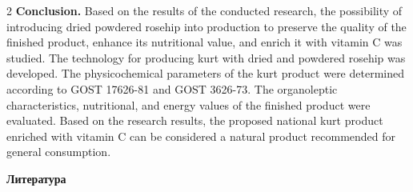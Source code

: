 \begin{multicols}{2}
{\bfseries Conclusion.} Based on the results of the conducted research, the
possibility of introducing dried powdered rosehip into production to
preserve the quality of the finished product, enhance its nutritional
value, and enrich it with vitamin C was studied. The technology for
producing kurt with dried and powdered rosehip was developed. The
physicochemical parameters of the kurt product were determined according
to GOST 17626-81 and GOST 3626-73. The organoleptic characteristics,
nutritional, and energy values of the finished product were evaluated.
Based on the research results, the proposed national kurt product
enriched with vitamin C can be considered a natural product recommended
for general consumption.
\end{multicols}

\begin{center}
{\bfseries Литература}
\end{center}

